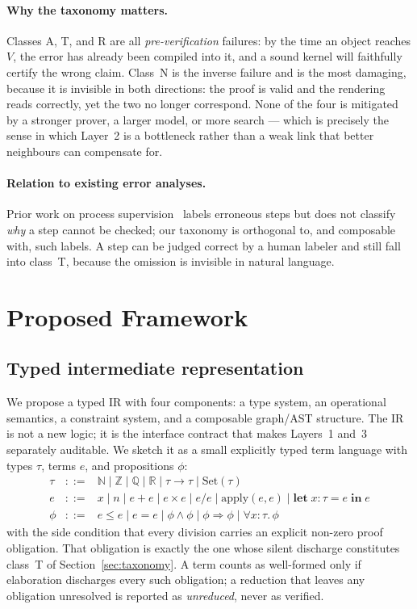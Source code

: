 \documentclass[11pt,a4paper]{article}
\begin{document}
\paragraph{Why the taxonomy matters.}
Classes A, T, and R are all \emph{pre-verification} failures: by the time an
object reaches $V$, the error has already been compiled into it, and a sound
kernel will faithfully certify the wrong claim.  Class~N is the inverse failure
and is the most damaging, because it is invisible in both directions: the proof
is valid and the rendering reads correctly, yet the two no longer correspond.
None of the four is mitigated by a stronger prover, a larger model, or more
search --- which is precisely the sense in which Layer~2 is a bottleneck rather
than a weak link that better neighbours can compensate for.

\paragraph{Relation to existing error analyses.}
Prior work on process supervision~\cite{lightman2023lets} labels erroneous steps
but does not classify \emph{why} a step cannot be checked; our taxonomy is
orthogonal to, and composable with, such labels.  A step can be judged correct
by a human labeler and still fall into class~T, because the omission is
invisible in natural language.

\section{Proposed Framework}
\label{sec:framework}

\subsection{Typed intermediate representation}
\label{sec:ir}
We propose a typed IR with four components: a type system, an operational
semantics, a constraint system, and a composable graph/AST structure.  The IR is
not a new logic; it is the interface contract that makes Layers~1 and~3
separately auditable.  We sketch it as a small explicitly typed term language
with types $\tau$, terms $e$, and propositions $\phi$:
\[
\begin{array}{rcl}
\tau & ::= & \mathbb{N} \mid \mathbb{Z} \mid \mathbb{Q} \mid \mathbb{R}
            \mid \tau \to \tau \mid \mathrm{Set}(\tau) \\[2pt]
e & ::= & x \mid n \mid e + e \mid e \times e \mid e/e
          \mid \mathrm{apply}(e,e) \mid \mathbf{let}\;x:\tau = e\;\mathbf{in}\;e \\[2pt]
\phi & ::= & e \le e \mid e = e \mid \phi \land \phi \mid \phi \Rightarrow \phi
            \mid \forall x{:}\tau.\,\phi
\end{array}
\]
with the side condition that every division carries an explicit non-zero proof
obligation.  That obligation is exactly the one whose silent discharge
constitutes class~T of Section~\ref{sec:taxonomy}.  A term counts as
well-formed only if elaboration discharges every such obligation; a reduction
that leaves any obligation unresolved is reported as \emph{unreduced}, never as
verified.
\end{document}
